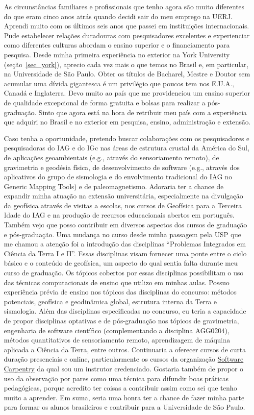\documentclass[10pt,a4paper,oneside]{book}
\begin{document}
As circunstâncias familiares e profissionais que tenho agora são muito
diferentes do que eram cinco anos atrás quando decidi sair do meu emprego na
UERJ.
Aprendi muito com os últimos seis anos que passei em instituições
internacionais.
Pude estabelecer relações duradouras com pesquisadores excelentes e
experienciar como diferentes culturas abordam o ensino superior e o
financiamento para pesquisa.
Desde minha primeira experiência no exterior na York University
(seção~\ref{sec_york}), aprecio cada vez mais o que temos no Brasil e, em
particular, na Universidade de São Paulo.
Obter os títulos de Bacharel, Mestre e Doutor sem acumular uma dívida
gigantesca é um privilégio que poucos tem nos E.U.A., Canadá e Inglaterra.
Devo muito ao país que me providenciou um ensino superior de qualidade
excepcional de forma gratuita e bolsas para realizar a pós-graduação.
Sinto que agora está na hora de retribuir meu país com a experiência que
adquiri no Brasil e no exterior em pesquisa, ensino, administração e extensão.

Caso tenha a oportunidade, pretendo buscar colaborações com os pesquisadores e
pesquisadoras do IAG e do IGc nas áreas de estrutura crustal da América do Sul,
de aplicações geoambientais (e.g., através do sensoriamento remoto), de
gravimetria e geodésia física, de desenvolvimento de software (e.g., através
dos aplicativos do grupo de sismologia e do envolvimento tradicional do IAG no
Generic Mapping Tools) e de paleomagnetismo.
Adoraria ter a chance de expandir minha atuação na extensão universitária,
especialmente na divulgação da geofísica através de visitas a escolas, nos
cursos de Geofísica para a Terceira Idade do IAG e na produção de recursos
educacionais abertos em português.
Também vejo que posso contribuir em diversos aspectos dos cursos de graduação
e pós-graduação.
Uma mudança no curso desde minha passagem pela USP que me chamou a atenção foi
a introdução das disciplinas ``Problemas Integrados em Ciência da Terra I e
II''.
Essas disciplinas visam fornecer uma ponte entre o ciclo básico e o conteúdo de
geofísica, um aspecto do qual sentia falta durante meu curso de graduação.
Os tópicos cobertos por essas disciplinas possibilitam o uso das técnicas
computacionais de ensino que utilizo em minhas aulas.
Possuo experiência prévia de ensino nos tópicos das disciplinas do concurso:
métodos potenciais, geofísica e geodinâmica global, estrutura interna da Terra
e sismologia.
Além das disciplinas especificadas no concurso, eu teria a capacidade de
propor disciplinas optativas e de pós-graduação nos tópicos de gravimetria,
engenharia de software científico (complementando a disciplina AGG0204),
métodos quantitativos de sensoriamento remoto, aprendizagem de máquina aplicada
a Ciência da Terra, entre outros.
Continuaria a oferecer cursos de curta duração presenciais e online,
particularmente os cursos da organização
\href{https://softwareunderground.org/}{Software Carpentry} da qual sou um
instrutor credenciado.
Gostaria também de propor o uso da observação por pares como uma técnica para
difundir boas práticas pedagógicas, porque acredito ter coisas a
contribuir assim como sei que tenho muito a aprender.
Em suma, seria uma honra ter a chance de fazer minha parte para formar os
alunos brasileiros e contribuir para a Universidade de São Paulo.


%
%
\end{document}

